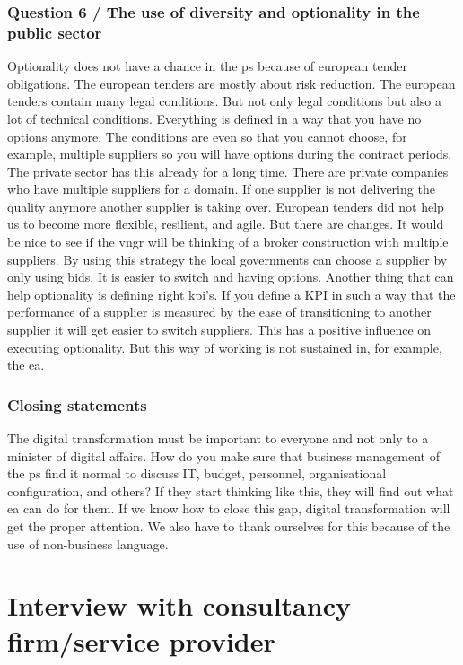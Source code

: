 \subsubsection{Question 6 / The use of diversity and optionality in the public sector}
Optionality does not have a chance in the \gls{ps} because of european tender obligations. The european tenders are mostly about risk reduction. The european tenders contain many legal conditions. But not only legal conditions but also a lot of technical conditions. Everything is defined in a way that you have no options anymore. The conditions are even so that you cannot choose, for example, multiple suppliers so you will have options during the contract periods. The private sector has this already for a long time. There are private companies who have multiple suppliers for a domain. If one supplier is not delivering the quality anymore another supplier is taking over. European tenders did not help us to become more flexible, resilient, and agile. But there are changes. It would be nice to see if the \acrfull{vngr} will be thinking of a broker construction with multiple suppliers. By using this strategy the local governments can choose a supplier by only using bids. It is easier to switch and having options. Another thing that can help optionality is defining right \acrfull{kpi}'s. If you define a KPI in such a way that the performance of a supplier is measured by the ease of transitioning to another supplier it will get easier to switch suppliers. This has a positive influence on executing optionality. But this way of working is not sustained in, for example, the \acrshort{ea}.
\subsubsection{Closing statements}
The digital transformation must be important to everyone and not only to a minister of digital affairs. How do you make sure that business management of the \gls{ps} find it normal to discuss IT, budget, personnel, organisational configuration, and others? If they start thinking like this, they will find out what \acrshort{ea} can do for them. If we know how to close this gap, digital transformation will get the proper attention. We also have to thank ourselves for this because of the use of non-business language.
\section{Interview with consultancy firm/service provider}
\label{sec:interviewconsultancyfirm}
